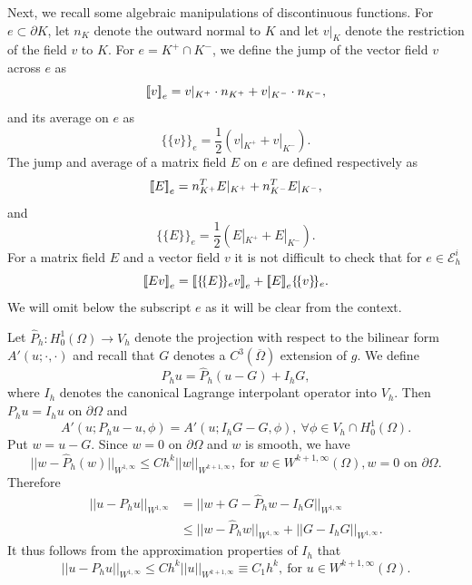 \documentclass[12pt]{amsart}
\def \[{ \mbox{[ \hspace{-.5em}[}} %
\def \]{ \mbox{] \hspace{-.5em}]}}
\numberwithin{equation}{section}
\newcommand{\tir}[1]{\ensuremath{\overline {#1}}}
\begin{document}
Next, we recall some algebraic manipulations of discontinuous functions. For $e \subset \partial K$, let $n_K$ denote the outward normal to $K$ and let $v|_K$ denote the restriction of the field $v$ to $K$. For $e=K^+ \cap K^-$, we define the jump of the vector field $v$ across $e$ as
\begin{equation}\label{jump}
\[v\]_e=v|_{K^+} \cdot n_{K^+} + v|_{K^-}  \cdot n_{K^-}, 
\end{equation}
and its average on $e$ as
\begin{equation}\label{average}
 \{\!\{v\}\!\}_e= \frac{1}{2}(v|_{K^+}  + v|_{K^-} ).
\end{equation}
The jump and average of a matrix field $E$ on $e$ are defined respectively as
\begin{equation}\label{matrix-jump}
\[E\]_e=n_{K^+}^T E|_{K^+}  +n_{K^-}^T E|_{K^-}, 
\end{equation}
and
\begin{equation}\label{matrix-average}
 \{\!\{E\}\!\}_e= \frac{1}{2}(E|_{K^+} + E|_{K^-}).
\end{equation}
For a matrix field $E$ and a vector field $v$ it is not difficult to check that for $e \in \mathcal{E}^i_h$
\begin{equation}\label{jumpaverage}
\[Ev\]_e=\[\{\!\{E\}\!\}_e v\]_e+\[E\]_e\{\!\{v\}\!\}_e. %
\end{equation}
We will omit below the subscript $e$ as it will be clear from the context.


Let $\hat{P}_h:H_0^1(\Omega) \rightarrow V_h$ denote the projection with respect to the bilinear form $A'(u;\cdot,\cdot)$ and recall that $G$ denotes a $C^3(\tir{\Omega})$ extension of $g$. We define 
$$
P_h u = \hat{P}_h(u-G) + I_h G,
$$
where $I_h$ denotes the canonical Lagrange interpolant operator into $V_h$.
Then
$P_h u = I_h u$ on $\partial \Omega$ and
\begin{equation}\label{2grid-proj-def}
A'(u;P_h u - u, \phi) = A'(u;I_h G - G, \phi) ,~ \forall \phi \in V_h \cap H_0^1(\Omega).
\end{equation}
Put $w=u-G$. Since $w=0$ on $\partial \Omega$ and $w$ is smooth, we have \cite[Corollary 8.1.12]{Brenner08}
\begin{equation*}
||w- \hat{P}_h(w)||_{W^{1,\infty}} \leq C h^{k} ||w||_{W^{k+1,\infty}}, \ \text{for } w \in W^{k+1,\infty}(\Omega), 
w=0 \text{ on } \partial \Omega. %
\end{equation*}
Therefore
\begin{align*}
||u-P_h u||_{W^{1,\infty}} & = ||w+ G - \hat{P}_h w-I_h G ||_{W^{1,\infty}} \\
& \leq ||w- \hat{P}_h w||_{W^{1,\infty}} +||G-I_h G||_{W^{1,\infty}}.
\end{align*}
It thus follows from the approximation properties of $I_h$ that
\begin{equation}
||u-P_h u||_{W^{1,\infty}} \leq C h^{k} ||u||_{W^{k+1,\infty}} \equiv C_1 h^k, \ \text{for } u \in W^{k+1,\infty}(\Omega).  \label{2grid-proj1}  
\end{equation}
\end{document}
